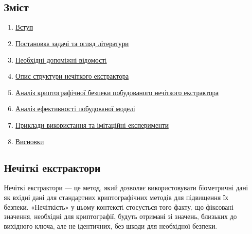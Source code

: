 \documentclass[11pt]{article}
\title{
      \text{Курсова робота}\\
      \text{На тему}\\
      \text{Fuzzy extractors}
    }
\providecommand{\tightlist}{%
      \setlength{\itemsep}{0pt}\setlength{\parskip}{0pt}}
\begin{document}
    
    \maketitle
    \hypertarget{fuzzy-extractors}{%
    \section*{}\label{fuzzy-extractors}}
    
    \hypertarget{ux437ux43cux456ux441ux442}{%
\subsection{Зміст}\label{ux437ux43cux456ux441ux442}}

\begin{enumerate}
\def\labelenumi{\arabic{enumi}.}
\tightlist
\item
  \hyperref[нечіткі-екстрактори]{Вступ}
\item
  \hyperref[постановка-задачі-та-огляд-літератури]{Постановка задачі та огляд літератури}
\item
  \hyperref[необхідні-допоміжні-відомості]{Необхідні допоміжні відомості}
\item
  \hyperref[опис-структури-нечіткого-екстрактора]{Опис структури нечіткого екстрактора}
\item
  \hyperref[аналіз-криптографічної-безпеки-побудованого-нечіткого-екстрактора]{Аналіз криптографічної безпеки побудованого нечіткого екстрактора}
\item
  \hyperref[аналіз-ефективності-побудованої-моделі]{Аналіз ефективності побудованої моделі}
\item
  \hyperref[приклади-використання]{Приклади використання та імітаційні експерименти}
\item
  \hyperref[висновки]{Висновки}
\end{enumerate}

    \hypertarget{ux43dux435ux447ux456ux442ux43aux456-ux435ux43aux441ux442ux440ux430ux43aux442ux43eux440ux438}{%
\subsection{Нечіткі
екстрактори}\label{ux43dux435ux447ux456ux442ux43aux456-ux435ux43aux441ux442ux440ux430ux43aux442ux43eux440ux438}}

    Нечіткі екстрактори --- це метод, який дозволяє використовувати
біометричні дані як вхідні дані для стандартних криптографічних методів
для підвищення їх безпеки. «Нечіткість» у цьому контексті стосується
того факту, що фіксовані значення, необхідні для криптографії, будуть
отримані зі значень, близьких до вихідного ключа, але не ідентичних, без
шкоди для необхідної безпеки.
\end{document}
